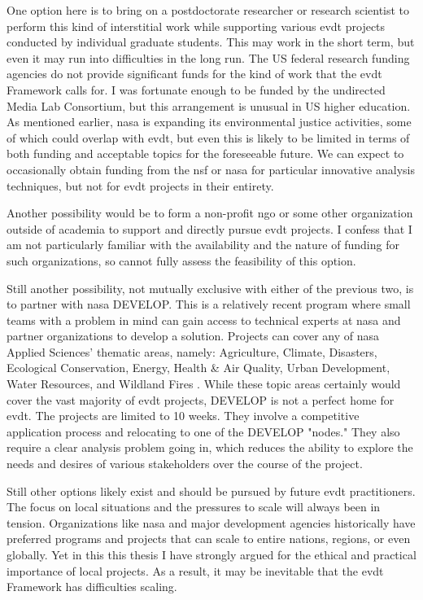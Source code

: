 One option here is to bring on a postdoctorate researcher or research scientist to perform this kind of interstitial work while supporting various \ac{evdt} projects conducted by individual graduate students. This may work in the short term, but even it may run into difficulties in the long run. The US federal research funding agencies do not provide significant funds for the kind of work that the \ac{evdt} Framework calls for. I was fortunate enough to be funded by the undirected Media Lab Consortium, but this arrangement is unusual in US higher education. As mentioned earlier, \ac{nasa} is expanding its environmental justice activities, some of which could overlap with \ac{evdt}, but even this is likely to be limited in terms of both funding and acceptable topics for the foreseeable future. We can expect to occasionally obtain funding from the \ac{nsf} or \ac{nasa} for particular innovative analysis techniques, but not for \ac{evdt} projects in their entirety. 

Another possibility would be to form a non-profit \ac{ngo} or some other organization outside of academia to support and directly pursue \ac{evdt} projects. I confess that I am not particularly familiar with the availability and the nature of funding for such organizations, so cannot fully assess the feasibility of this option. 

Still another possibility, not mutually exclusive with either of the previous two, is to partner with \ac{nasa} DEVELOP. This is a relatively recent program where small teams with a problem in mind can gain access to technical experts at \ac{nasa} and partner organizations to develop a solution. Projects can cover any of \ac{nasa} Applied Sciences' thematic areas, namely: Agriculture, Climate, Disasters, Ecological Conservation, Energy, Health \& Air Quality, Urban Development, Water Resources, and Wildland Fires \cite{nasaappliedsciencesDEVELOP}. While these topic areas certainly would cover the vast majority of \ac{evdt} projects, DEVELOP is not a perfect home for \ac{evdt}. The projects are limited to 10 weeks. They involve a competitive application process and relocating to one of the DEVELOP "nodes." They also require a clear analysis problem going in, which reduces the ability to explore the needs and desires of various stakeholders over the course of the project.

Still other options likely exist and should be pursued by future \ac{evdt} practitioners. The focus on local situations and the pressures to scale will always been in tension. Organizations like \ac{nasa} and major development agencies historically have preferred programs and projects that can scale to entire nations, regions, or even globally. Yet in this this thesis I have strongly argued for the ethical and practical importance of local projects. As a result, it may be inevitable that the \ac{evdt} Framework has difficulties scaling.	

